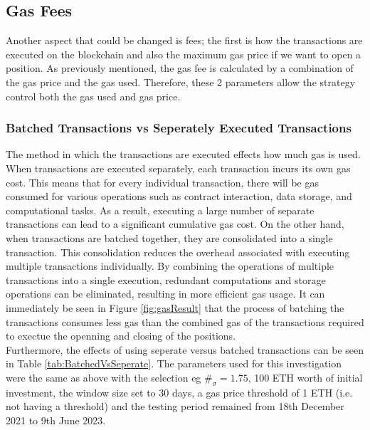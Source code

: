 \subsection{Gas Fees}
Another aspect that could be changed is fees; the first is how the transactions are executed on the blockchain and also the maximum gas price if we want to open a position. As previously mentioned, the gas fee is calculated by a combination of the gas price and the gas used. Therefore, these 2 parameters allow the strategy control both the gas used and gas price.

\subsubsection{Batched Transactions vs Seperately Executed Transactions}
The method in which the transactions are executed effects how much gas is used. When transactions are executed separately, each transaction incurs its own gas cost. This means that for every individual transaction, there will be gas consumed for various operations such as contract interaction, data storage, and computational tasks. As a result, executing a large number of separate transactions can lead to a significant cumulative gas cost. On the other hand, when transactions are batched together, they are consolidated into a single transaction. This consolidation reduces the overhead associated with executing multiple transactions individually. By combining the operations of multiple transactions into a single execution, redundant computations and storage operations can be eliminated, resulting in more efficient gas usage. It can immediately be seen in Figure \ref{fig:gasResult} that the process of batching the transactions consumes less gas than the combined gas of the transactions required to exectue the openning and closing of the positions.
\\[3mm]
Furthermore, the effects of using seperate versus batched transactions can be seen in Table \ref{tab:BatchedVsSeperate}. The parameters used for this investigation were the same as above with the selection eg $\#_{\sigma} = 1.75$, 100 ETH worth of initial investment, the window size set to 30 days, a gas price threshold of 1 ETH (i.e. not having a threshold) and the testing period remained from 18th December 2021 to 9th June 2023.

